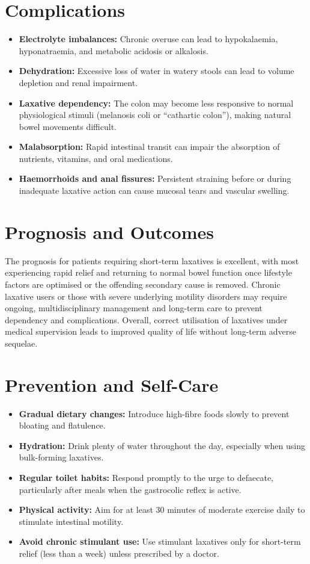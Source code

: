 \section*{Complications}
\begin{itemize}
    \item \textbf{Electrolyte imbalances:} Chronic overuse can lead to hypokalaemia, hyponatraemia, and metabolic acidosis or alkalosis.
    \item \textbf{Dehydration:} Excessive loss of water in watery stools can lead to volume depletion and renal impairment.
    \item \textbf{Laxative dependency:} The colon may become less responsive to normal physiological stimuli (melanosis coli or ``cathartic colon''), making natural bowel movements difficult.
    \item \textbf{Malabsorption:} Rapid intestinal transit can impair the absorption of nutrients, vitamins, and oral medications.
    \item \textbf{Haemorrhoids and anal fissures:} Persistent straining before or during inadequate laxative action can cause mucosal tears and vascular swelling.
\end{itemize}

\section*{Prognosis and Outcomes}
The prognosis for patients requiring short-term laxatives is excellent, with most experiencing rapid relief and returning to normal bowel function once lifestyle factors are optimised or the offending secondary cause is removed. Chronic laxative users or those with severe underlying motility disorders may require ongoing, multidisciplinary management and long-term care to prevent dependency and complications. Overall, correct utilisation of laxatives under medical supervision leads to improved quality of life without long-term adverse sequelae.

\section*{Prevention and Self-Care}
\begin{itemize}
    \item \textbf{Gradual dietary changes:} Introduce high-fibre foods slowly to prevent bloating and flatulence.
    \item \textbf{Hydration:} Drink plenty of water throughout the day, especially when using bulk-forming laxatives.
    \item \textbf{Regular toilet habits:} Respond promptly to the urge to defaecate, particularly after meals when the gastrocolic reflex is active.
    \item \textbf{Physical activity:} Aim for at least 30 minutes of moderate exercise daily to stimulate intestinal motility.
    \item \textbf{Avoid chronic stimulant use:} Use stimulant laxatives only for short-term relief (less than a week) unless prescribed by a doctor.
\end{itemize}

